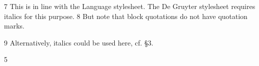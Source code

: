  	
 	
 	
 	
 	
 	
 	
 	
 	
 	
 	
 	
 	
 	
 	
 	
 	
 	
 	
 	
 	
 	
 	
 	
 	
 	
 	
 	
 	
 	
 	
 	
 	
 	
 	
 	
 	
 	
 	
 	
 	
 	
 	
 	
 	
 	
 	
 	
 	
 	
	
 
7
This is in line with the Language stylesheet. The De Gruyter stylesheet requires italics for this purpose.
8
 But note that block quotations do not have quotation marks.	
 
9	
 Alternatively, italics could be used here, cf. §3.
	
 
 5	
  
